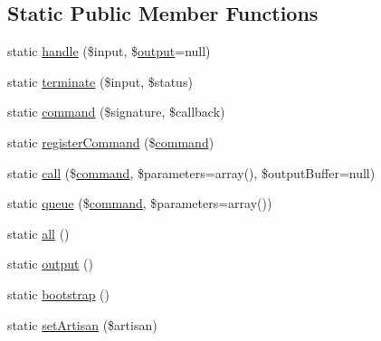 \subsection*{Static Public Member Functions}
\begin{DoxyCompactItemize}
\item 
static \mbox{\hyperlink{class_illuminate_1_1_support_1_1_facades_1_1_artisan_a10a704e88a4a0f68ac198925f61b7495}{handle}} (\$input, \$\mbox{\hyperlink{class_illuminate_1_1_support_1_1_facades_1_1_artisan_a4de7cc04e2533e4f27c18239d831f5ad}{output}}=null)
\item 
static \mbox{\hyperlink{class_illuminate_1_1_support_1_1_facades_1_1_artisan_a8c902ee4dd700d08fd34ec6bcea9c064}{terminate}} (\$input, \$status)
\item 
static \mbox{\hyperlink{class_illuminate_1_1_support_1_1_facades_1_1_artisan_ac38347f7a2e06aa73d1a540921efdc27}{command}} (\$signature, \$callback)
\item 
static \mbox{\hyperlink{class_illuminate_1_1_support_1_1_facades_1_1_artisan_a8b26d2007bc40cec225f3b3954a8bc44}{register\+Command}} (\$\mbox{\hyperlink{class_illuminate_1_1_support_1_1_facades_1_1_artisan_ac38347f7a2e06aa73d1a540921efdc27}{command}})
\item 
static \mbox{\hyperlink{class_illuminate_1_1_support_1_1_facades_1_1_artisan_acbaec7ed7b40aee353ee70a69c78ea86}{call}} (\$\mbox{\hyperlink{class_illuminate_1_1_support_1_1_facades_1_1_artisan_ac38347f7a2e06aa73d1a540921efdc27}{command}}, \$parameters=array(), \$output\+Buffer=null)
\item 
static \mbox{\hyperlink{class_illuminate_1_1_support_1_1_facades_1_1_artisan_ac4bf1bf3446b86a77d55d2cf7ec1de5d}{queue}} (\$\mbox{\hyperlink{class_illuminate_1_1_support_1_1_facades_1_1_artisan_ac38347f7a2e06aa73d1a540921efdc27}{command}}, \$parameters=array())
\item 
static \mbox{\hyperlink{class_illuminate_1_1_support_1_1_facades_1_1_artisan_a87c2e2a664fba062b3fe585ff8997e2e}{all}} ()
\item 
static \mbox{\hyperlink{class_illuminate_1_1_support_1_1_facades_1_1_artisan_a4de7cc04e2533e4f27c18239d831f5ad}{output}} ()
\item 
static \mbox{\hyperlink{class_illuminate_1_1_support_1_1_facades_1_1_artisan_a08f421ef4a6faca630fb0c1ac505cc73}{bootstrap}} ()
\item 
static \mbox{\hyperlink{class_illuminate_1_1_support_1_1_facades_1_1_artisan_aea54192de87c7c3978fd552dc114e2ed}{set\+Artisan}} (\$artisan)
\end{DoxyCompactItemize}


